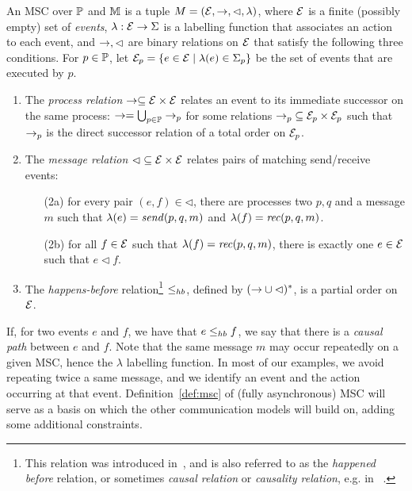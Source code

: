 \begin{definition}[MSC]\label{def:msc}
	An {MSC}  over $\mathbb{P}$ and $\mathbb{M}$ is a tuple $M = (\mathcal{E},\to,\lhd,\lambda)$, where 
	$\mathcal{E}$ is a finite (possibly empty) set of \emph{events}, $\lambda: \mathcal{E} \to \Sigma$ is a labelling 
	function that associates an action to each event,
	and $\to,\lhd$ are binary relations on $\mathcal{E}$ that satisfy the following three conditions.
	For $p \in \mathbb{P}$, let $\mathcal{E}_p = \{e \in \mathcal{E} \mid \lambda(e) \in \Sigma_{p}\}$ be 
	the set of events that are executed by $p$. 
	\begin{enumerate}
		\item The \emph{process relation} $\to\subseteq \mathcal{E} \times \mathcal{E}$ 
		relates an event to its immediate successor on
		the same process:
		$\to=\bigcup_{p \in \mathbb{P}} \to_p$ for some 
		relations ${\to_p} \subseteq \mathcal{E}_p \times \mathcal{E}_p$ such that $\to_p$ is 
		the direct successor relation of a total order on $\mathcal{E}_p$.  
		\item The \emph{message relation} ${\lhd} \subseteq \mathcal{E} \times \mathcal{E}$ 
		relates pairs of matching send/receive events: 	
		\begin{enumerate}%
			\item[(2a)] for every pair $(e,f) \in {\lhd}$, there are processes two $p,q$ and a message $m$ such that $\lambda(e) = \mathit{send}(p, q, m)$ and $\lambda(f) = \mathit{rec}(p, q, m)$.
			\item[(2b)] for all $f \in \mathcal{E}$ such that $\lambda(f) = \mathit{rec}(p, q, m)$, %
			there is exactly one $e \in \mathcal{E}$ such that $e \lhd f$.
		\end{enumerate}
		\item The \emph{happens-before} relation\footnote{This relation was introduced in~\cite{Lamport78}, and is also referred to as the \emph{happened before} relation,
		or sometimes \emph{causal relation} or \emph{causality relation}, e.g. in~\cite{DBLP:journals/dc/Charron-BostMT96,DBLP:conf/cav/BouajjaniEJQ18} .} ${\leq_{hb}}$, defined by $({\to} \cup {\lhd})^\ast$,
		is a partial order on $\mathcal{E}$.
	\end{enumerate}
\end{definition}

 If, for two events $e$ and $f$, we have that $e \leq_{hb} f$, we   say that there is a \emph{causal path} between $e$ and $f$.
Note that the same message $m$ may occur repeatedly on a given MSC,
hence the $\lambda$ labelling function. In most of our 
examples, we avoid repeating twice a same message, and we
identify an event and the action occurring at that event.
Definition~\ref{def:msc} of (fully asynchronous) MSC will serve as a basis on which the other communication models will build on, adding some additional constraints.

